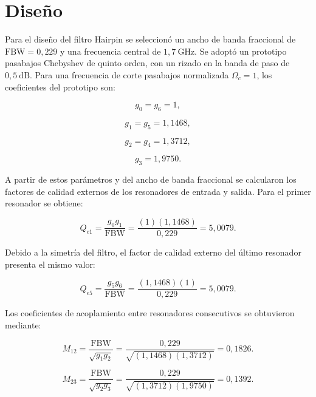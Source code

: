 \section{Diseño}
Para el diseño del filtro Hairpin se seleccionó un ancho de banda fraccional de $\mathrm{FBW} = 0{,}229$ y una frecuencia central de $1{,}7~\mathrm{GHz}$. Se adoptó un prototipo pasabajos Chebyshev de quinto orden, con un rizado en la banda de paso de $0{,}5~\mathrm{dB}$. Para una frecuencia de corte pasabajos normalizada $\Omega_c = 1$, los coeficientes del prototipo son:

\begin{equation}
g_0 = g_6 = 1,
\end{equation}

\begin{equation}
g_1 = g_5 = 1{,}1468,
\end{equation}

\begin{equation}
g_2 = g_4 = 1{,}3712,
\end{equation}

\begin{equation}
g_3 = 1{,}9750.
\end{equation}

A partir de estos parámetros y del ancho de banda fraccional se calcularon los factores de calidad externos de los resonadores de entrada y salida. Para el primer resonador se obtiene:

\begin{equation}
    Q_{e1} = \frac{g_0 g_1}{\mathrm{FBW}} = \frac{(1)(1{,}1468)}{0{,}229} = 5{,}0079.
\end{equation}

Debido a la simetría del filtro, el factor de calidad externo del último resonador presenta el mismo valor:

\begin{equation}
    Q_{e5} = \frac{g_5 g_6}{\mathrm{FBW}} = \frac{(1{,}1468)(1)}{0{,}229} = 5{,}0079.
\end{equation}

Los coeficientes de acoplamiento entre resonadores consecutivos se obtuvieron mediante:

\begin{equation}
    M_{12} = \frac{\mathrm{FBW}}{\sqrt{g_1 g_2}} = \frac{0{,}229}{\sqrt{(1{,}1468)(1{,}3712)}} = 0{,}1826.
\end{equation}

\begin{equation}
    M_{23} = \frac{\mathrm{FBW}}{\sqrt{g_2 g_3}} = \frac{0{,}229}{\sqrt{(1{,}3712)(1{,}9750)}} = 0{,}1392.
\end{equation}

